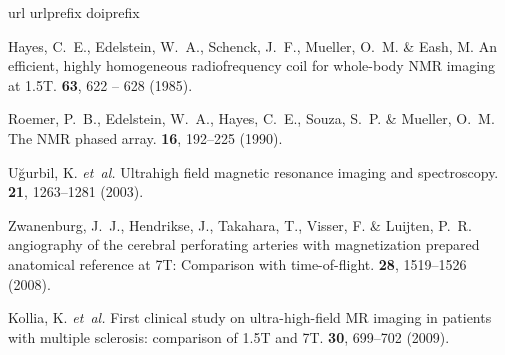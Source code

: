 \documentclass[fleqn,10pt]{wlscirep}
\begin{document}
\begin{thebibliography}{10}
\expandafter\ifx\csname url\endcsname\relax
  \def\url#1{\texttt{#1}}\fi
\expandafter\ifx\csname urlprefix\endcsname\relax\def\urlprefix{URL }\fi
\expandafter\ifx\csname doiprefix\endcsname\relax\def\doiprefix{DOI }\fi
\providecommand{\bibinfo}[2]{#2}
\providecommand{\eprint}[2][]{\url{#2}}

\bibinfo{author}{Hayes, C.~E.}, \bibinfo{author}{Edelstein, W.~A.},
  \bibinfo{author}{Schenck, J.~F.}, \bibinfo{author}{Mueller, O.~M.} \&
  \bibinfo{author}{Eash, M.}
\newblock \bibinfo{journal}{\bibinfo{title}{An efficient, highly homogeneous
  radiofrequency coil for whole-body {NMR} imaging at 1.5{T}}}.
  \textbf{\bibinfo{volume}{63}}, \bibinfo{pages}{622 -- 628}
  (\bibinfo{year}{1985}).

\bibinfo{author}{Roemer, P.~B.}, \bibinfo{author}{Edelstein, W.~A.},
  \bibinfo{author}{Hayes, C.~E.}, \bibinfo{author}{Souza, S.~P.} \&
  \bibinfo{author}{Mueller, O.~M.}
\newblock \bibinfo{journal}{\bibinfo{title}{The {NMR} phased array}}.
  \textbf{\bibinfo{volume}{16}}, \bibinfo{pages}{192--225}
  (\bibinfo{year}{1990}).

\bibinfo{author}{U{\u{g}}urbil, K.} \emph{et~al.}
\newblock \bibinfo{journal}{\bibinfo{title}{Ultrahigh field magnetic resonance
  imaging and spectroscopy}}.
  \textbf{\bibinfo{volume}{21}}, \bibinfo{pages}{1263--1281}
  (\bibinfo{year}{2003}).

\bibinfo{author}{Zwanenburg, J.~J.}, \bibinfo{author}{Hendrikse, J.},
  \bibinfo{author}{Takahara, T.}, \bibinfo{author}{Visser, F.} \&
  \bibinfo{author}{Luijten, P.~R.}
\newblock \bibinfo{journal}{\bibinfo{title}{{MR} angiography of the cerebral
  perforating arteries with magnetization prepared anatomical reference at
  7{T}: Comparison with time-of-flight}}.
  \textbf{\bibinfo{volume}{28}}, \bibinfo{pages}{1519--1526}
  (\bibinfo{year}{2008}).

\bibinfo{author}{Kollia, K.} \emph{et~al.}
\newblock \bibinfo{journal}{\bibinfo{title}{First clinical study on
  ultra-high-field {MR} imaging in patients with multiple sclerosis: comparison
  of 1.5{T} and 7{T}}}.
  \textbf{\bibinfo{volume}{30}}, \bibinfo{pages}{699--702}
  (\bibinfo{year}{2009}).


\end{thebibliography}
\end{document}
